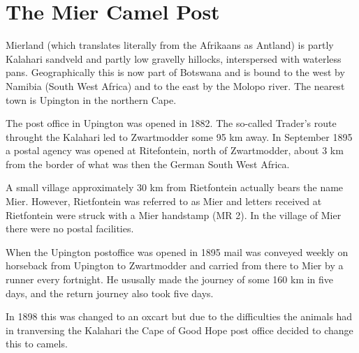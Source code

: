 \chapter{The Mier Camel Post}





Mierland (which translates literally from the Afrikaans as Antland) is partly 
Kalahari sandveld and partly low gravelly hillocks, interspersed with waterless pans. Geographically this is now part of Botswana and is bound to the west by Namibia (South West Africa) and to the east by the Molopo river. The nearest town is Upington in the northern Cape. 

The post office in Upington was opened in 1882. The so-called Trader's route throught the Kalahari led to Zwartmodder some 95 km away. In September 1895 a postal agency was opened at Ritefontein, north of Zwartmodder, about 3 km from the border of what was then the German South West Africa.

A small village approximately 30 km from Rietfontein actually bears the name Mier. However, Rietfontein was referred to as Mier and letters received at Rietfontein were struck with a Mier handstamp (MR 2). In the village of Mier there were no postal facilities.

When the Upington postoffice was opened in 1895 mail was conveyed weekly on horseback from Upington to Zwartmodder and carried from there to Mier by a runner every fortnight. He ususally made the journey of some 160 km in five days, and the return journey also took five days.

In 1898 this was changed to an oxcart but due to the difficulties the animals had in tranversing the Kalahari the Cape of Good Hope post office decided to change this to camels.

